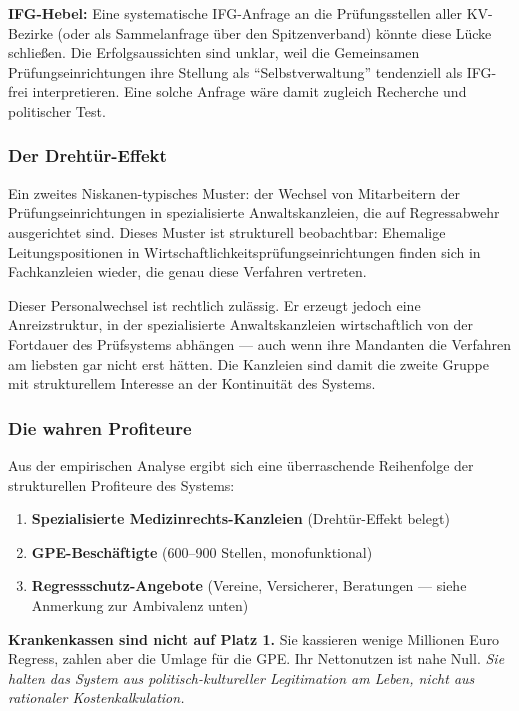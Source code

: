 \documentclass{umbruch-position}
\begin{document}
\textbf{IFG-Hebel:} Eine systematische IFG-Anfrage an die Prüfungsstellen aller KV-Bezirke (oder als Sammelanfrage über den Spitzenverband) könnte diese Lücke schließen. Die Erfolgsaussichten sind unklar, weil die Gemeinsamen Prüfungseinrichtungen ihre Stellung als ``Selbstverwaltung'' tendenziell als IFG-frei interpretieren. Eine solche Anfrage wäre damit zugleich Recherche und politischer Test.

\subsubsection{Der Drehtür-Effekt}

Ein zweites Niskanen-typisches Muster: der Wechsel von Mitarbeitern der Prüfungseinrichtungen in spezialisierte Anwaltskanzleien, die auf Regressabwehr ausgerichtet sind. Dieses Muster ist strukturell beobachtbar: Ehemalige Leitungspositionen in Wirtschaftlichkeitsprüfungseinrichtungen finden sich in Fachkanzleien wieder, die genau diese Verfahren vertreten.

Dieser Personalwechsel ist rechtlich zulässig. Er erzeugt jedoch eine Anreizstruktur, in der spezialisierte Anwaltskanzleien wirtschaftlich von der Fortdauer des Prüfsystems abhängen --- auch wenn ihre Mandanten die Verfahren am liebsten gar nicht erst hätten. Die Kanzleien sind damit die zweite Gruppe mit strukturellem Interesse an der Kontinuität des Systems.

\subsubsection{Die wahren Profiteure}

Aus der empirischen Analyse ergibt sich eine überraschende Reihenfolge der strukturellen Profiteure des Systems:

\begin{enumerate}[nosep]
  \item \textbf{Spezialisierte Medizinrechts-Kanzleien} (Drehtür-Effekt belegt)
  \item \textbf{GPE-Beschäftigte} (600--900 Stellen, monofunktional)
  \item \textbf{Regressschutz-Angebote} (Vereine, Versicherer, Beratungen — siehe Anmerkung zur Ambivalenz unten)
\end{enumerate}

\textbf{Krankenkassen sind nicht auf Platz 1.} Sie kassieren wenige Millionen Euro Regress, zahlen aber die Umlage für die GPE. Ihr Nettonutzen ist nahe Null. \textit{Sie halten das System aus politisch-kultureller Legitimation am Leben, nicht aus rationaler Kostenkalkulation.}
\end{document}
